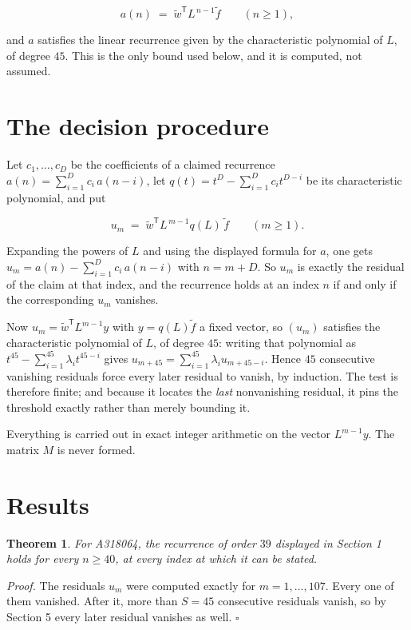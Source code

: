 \documentclass[11pt]{article}
\newtheorem{theorem}{Theorem}
\theoremstyle{definition}
\begin{document}
\[a(n) \;=\; \tilde w^{\mathsf T} L^{\,n-1} \tilde f \qquad (n \ge 1),\]

and $a$ satisfies the linear recurrence given by the characteristic polynomial of $L$, of degree $45$. This is the only bound used below, and it is computed, not assumed.

\section{The decision procedure}

Let $c_1,\dots,c_D$ be the coefficients of a claimed recurrence $a(n) = \sum_{i=1}^{D} c_i\,a(n-i)$, let $q(t) = t^{D} - \sum_{i=1}^{D} c_i t^{D-i}$ be its characteristic polynomial, and put

\[u_m \;=\; \tilde w^{\mathsf T} L^{\,m-1} q(L)\,\tilde f \qquad (m \ge 1).\]

Expanding the powers of $L$ and using the displayed formula for $a$, one gets $u_m = a(n) - \sum_{i=1}^{D} c_i\,a(n-i)$ with $n = m + D$. So $u_m$ is exactly the residual of the claim at that index, and the recurrence holds at an index $n$ if and only if the corresponding $u_m$ vanishes.

Now $u_m = \tilde w^{\mathsf T} L^{m-1} y$ with $y = q(L)\tilde f$ a fixed vector, so $(u_m)$ satisfies the characteristic polynomial of $L$, of degree $45$: writing that polynomial as $t^{45} - \sum_{i=1}^{45} \lambda_i t^{45-i}$ gives $u_{m+45} = \sum_{i=1}^{45} \lambda_i u_{m+45-i}$. Hence $45$ consecutive vanishing residuals force every later residual to vanish, by induction. The test is therefore finite; and because it locates the {\itshape last} nonvanishing residual, it pins the threshold exactly rather than merely bounding it.

Everything is carried out in exact integer arithmetic on the vector $L^{m-1}y$. The matrix $M$ is never formed.

\section{Results}

\begin{theorem} For A318064, the recurrence of order $39$ displayed in Section 1 holds for every $n \ge 40$, at every index at which it can be stated.\end{theorem}

{\itshape Proof.} The residuals $u_m$ were computed exactly for $m = 1,\dots,107$. Every one of them vanished. After it, more than $S = 45$ consecutive residuals vanish, so by Section 5 every later residual vanishes as well. $\square$
\end{document}
